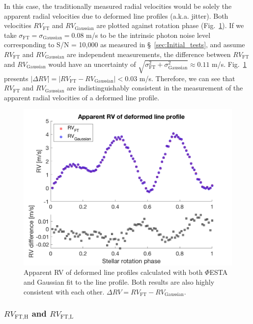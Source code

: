 In this case, the traditionally measured radial velocities would be solely the apparent radial velocities due to deformed line profiles (a.k.a. jitter). Both velocities $RV_\text{FT}$ and $RV_\text{Gaussian}$ are plotted against rotation phase (Fig.~\ref{fig:rv_recovery_deformed}). If we take $\sigma_\text{FT} = \sigma_\text{Gaussian} = 0.08$ m/s to be the intrinsic photon noise level corresponding to S/N = 10,000 as measured in \S~\ref{sec:Initial_tests}, and assume $RV_\text{FT}$ and $RV_\text{Gaussian}$ are independent measurements, the difference between $RV_\text{FT}$ and $RV_\text{Gaussian}$ would have an uncertainty of $\sqrt{\sigma_\text{FT}^2+\sigma_\text{Gaussian}^2}\approx0.11$ m/s. Fig.~\ref{fig:rv_recovery_deformed} presents $\mid \Delta RV \mid = \mid RV_\text{FT} - RV_\text{Gaussian}\mid < 0.03$ m/s. Therefore, we can see that $RV_\text{FT}$ and $RV_\text{Gaussian}$ are indistinguishably consistent in the measurement of the apparent radial velocities of a deformed line profile. 

\begin{figure}[tbp]
\centering
\includegraphics[width = 0.7 \linewidth]
{./Figures/Methods/5-JITTER_ONLY_3.png}
\caption[Apparent RV of deformed line profiles]
{Apparent RV of deformed line profiles calculated with both $\mathit{\Phi}$ESTA and Gaussian fit to the line profile. Both results are also highly consistent with each other. $\Delta RV  = RV_\text{FT} - RV_\text{Gaussian}$.}
\label{fig:rv_recovery_deformed}
\end{figure} 
\FloatBarrier

\subsubsection{$RV_\text{FT,H}$ and $RV_\text{FT,L}$}
\label{subsec:FT,HL}

